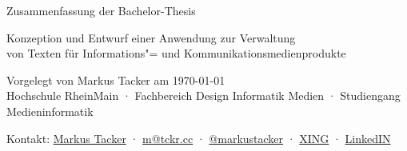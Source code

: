 \documentclass[11pt,a4paper]{article}
\begin{document}
\setmainfont[Mapping=tex-text]{Museo Sans}

\begin{center}
Zusammenfassung der Bachelor-Thesis\\
\begin{large}
Konzeption und Entwurf einer Anwendung zur Verwaltung\\von Texten für Informations"= und Kommunikationsmedienprodukte\\
\end{large}
\bigskip
\begin{tiny}
Vorgelegt von Markus Tacker am \today\\
Hochschule RheinMain · Fachbereich Design Informatik Medien · Studiengang Medieninformatik\\
\end{tiny}
\end{center}

\setmainfont[Mapping=tex-text,BoldFont={Vollkorn-Bold},ItalicFont={Vollkorn-Italic},BoldItalicFont={Vollkorn-Bold Italic}]{Vollkorn}
\setsansfont[Mapping=tex-text]{Museo Sans}



\begin{center}
\begin{small}
Kontakt: \href{http://tckr.cc/}{Markus Tacker} · \href{mailto:m@tckr.cc}{m@tckr.cc} · \href{http://twitter.com/markustacker}{@markustacker} · \href{https://www.xing.com/profile/Markus_Tacker}{XING} · \href{http://www.linkedin.com/in/markustacker}{LinkedIN}
\end{small}
\end{center}
\end{document}

